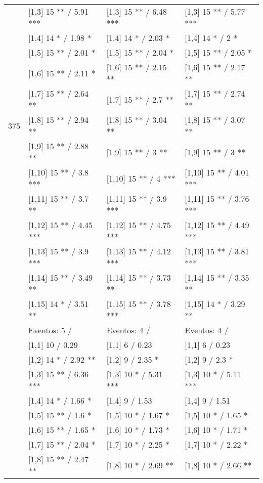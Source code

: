 \begin{table}
\begin{tabular}[t]{llll}
 & {}[1,3] 15 ** / 5.91 *** & {}[1,3] 15 ** / 6.48 *** & {}[1,3] 15 ** / 5.77 ***\\
\addlinespace
 & {}[1,4] 14 * / 1.98 * & {}[1,4] 14 * / 2.03 * & {}[1,4] 14 * / 2 *\\
 & {}[1,5] 15 ** / 2.01 * & {}[1,5] 15 ** / 2.04 * & {}[1,5] 15 ** / 2.05 *\\
 & {}[1,6] 15 ** / 2.11 * & {}[1,6] 15 ** / 2.15 ** & {}[1,6] 15 ** / 2.17 **\\
 & {}[1,7] 15 ** / 2.64 ** & {}[1,7] 15 ** / 2.7 ** & {}[1,7] 15 ** / 2.74 **\\
375 & {}[1,8] 15 ** / 2.94 ** & {}[1,8] 15 ** / 3.04 ** & {}[1,8] 15 ** / 3.07 **\\
\addlinespace
 & {}[1,9] 15 ** / 2.88 ** & {}[1,9] 15 ** / 3 ** & {}[1,9] 15 ** / 3 **\\
 & {}[1,10] 15 ** / 3.8 *** & {}[1,10] 15 ** / 4 *** & {}[1,10] 15 ** / 4.01 ***\\
 & {}[1,11] 15 ** / 3.7 ** & {}[1,11] 15 ** / 3.9 *** & {}[1,11] 15 ** / 3.76 ***\\
 & {}[1,12] 15 ** / 4.45 *** & {}[1,12] 15 ** / 4.75 *** & {}[1,12] 15 ** / 4.49 ***\\
 & {}[1,13] 15 ** / 3.9 *** & {}[1,13] 15 ** / 4.12 *** & {}[1,13] 15 ** / 3.81 ***\\
\addlinespace
 & {}[1,14] 15 ** / 3.49 ** & {}[1,14] 15 ** / 3.73 ** & {}[1,14] 15 ** / 3.35 **\\
 & {}[1,15] 14 * / 3.51 ** & {}[1,15] 15 ** / 3.78 *** & {}[1,15] 14 * / 3.29 **\\
 & Eventos:  5 / & Eventos:  4 / & Eventos:  4 /\\
 & {}[1,1] 10  / 0.29 & {}[1,1] 6  / 0.23 & {}[1,1] 6  / 0.23\\
 & {}[1,2] 14 * / 2.92 ** & {}[1,2] 9  / 2.35 * & {}[1,2] 9  / 2.3 *\\
\addlinespace
 & {}[1,3] 15 ** / 6.36 *** & {}[1,3] 10 * / 5.31 *** & {}[1,3] 10 * / 5.11 ***\\
 & {}[1,4] 14 * / 1.66 * & {}[1,4] 9  / 1.53 & {}[1,4] 9  / 1.51\\
 & {}[1,5] 15 ** / 1.6 * & {}[1,5] 10 * / 1.67 * & {}[1,5] 10 * / 1.65 *\\
 & {}[1,6] 15 ** / 1.65 * & {}[1,6] 10 * / 1.73 * & {}[1,6] 10 * / 1.71 *\\
 & {}[1,7] 15 ** / 2.04 * & {}[1,7] 10 * / 2.25 * & {}[1,7] 10 * / 2.22 *\\
\addlinespace
500 & {}[1,8] 15 ** / 2.47 ** & {}[1,8] 10 * / 2.69 ** & {}[1,8] 10 * / 2.66 **\\

\end{tabular}
\end{table}
